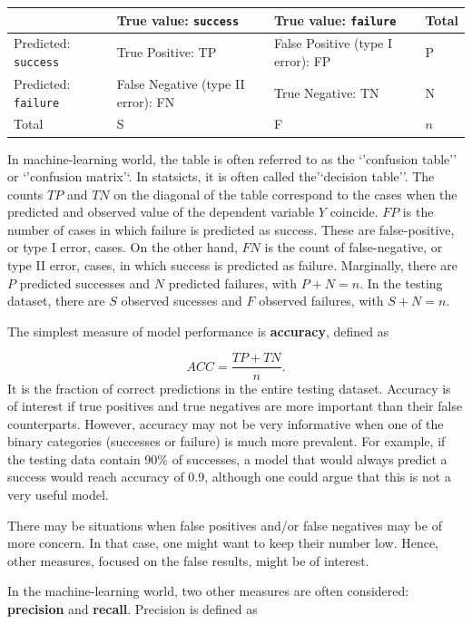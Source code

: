 \documentclass[12pt,]{krantz}
\begin{document}
\begin{longtable}[]{@{}llll@{}}
\toprule
& True value: \texttt{success} & True value: \texttt{failure} & Total\tabularnewline
\midrule
\endhead
Predicted: \texttt{success} & True Positive: TP & False Positive (type I error): FP & P\tabularnewline
Predicted: \texttt{failure} & False Negative (type II error): FN & True Negative: TN & N\tabularnewline
Total & S & F & \(n\)\tabularnewline
\bottomrule
\end{longtable}

In machine-learning world, the table is often referred to as the `'confusion table'' or `'confusion matrix'`. In statsicts, it is often called the'`decision table''. The counts \(TP\) and \(TN\) on the diagonal of the table correspond to the cases when the predicted and observed value of the dependent variable \(Y\) coincide. \(FP\) is the number of cases in which failure is predicted as success. These are false-positive, or type I error, cases. On the other hand, \(FN\) is the count of false-negative, or type II error, cases, in which success is predicted as failure. Marginally, there are \(P\) predicted successes and \(N\) predicted failures, with \(P+N=n\). In the testing dataset, there are \(S\) observed sucesses and \(F\) observed failures, with \(S+N=n\).

The simplest measure of model performance is \textbf{accuracy}, defined as

\[
ACC = \frac{TP+TN}{n}.
\]
It is the fraction of correct predictions in the entire testing dataset. Accuracy is of interest if true positives and true negatives are more important than their false counterparts. However, accuracy may not be very informative when one of the binary categories (successes or failure) is much more prevalent. For example, if the testing data contain 90\% of successes, a model that would always predict a success would reach accuracy of 0.9, although one could argue that this is not a very useful model.

There may be situations when false positives and/or false negatives may be of more concern. In that case, one might want to keep their number low. Hence, other measures, focused on the false results, might be of interest.

In the machine-learning world, two other measures are often considered: \textbf{precision} and \textbf{recall}. Precision is defined as
\end{document}
